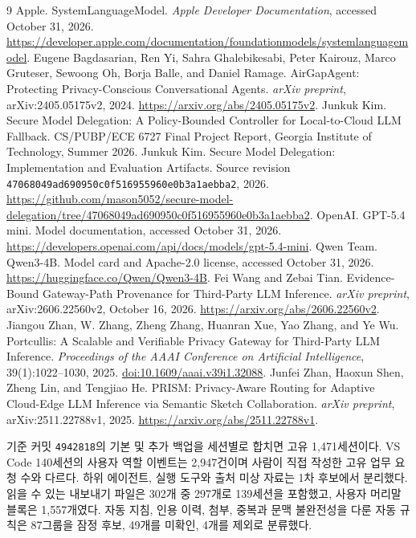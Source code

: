 \documentclass[10pt,letterpaper,twocolumn]{article}
\makeatletter
\renewcommand{\section}{\@startsection{section}{1}{\z@}{-2ex plus -.5ex minus -.2ex}{1ex plus .2ex}{\large\bfseries\raggedright}}
\makeatother
\begin{document}
\begin{thebibliography}{9}
Apple.
SystemLanguageModel. \emph{Apple Developer Documentation}, accessed October 31, 2026.
\url{https://developer.apple.com/documentation/foundationmodels/systemlanguagemodel}.
Eugene Bagdasarian, Ren Yi, Sahra Ghalebikesabi, Peter Kairouz, Marco Gruteser, Sewoong Oh, Borja Balle, and Daniel Ramage.
AirGapAgent: Protecting Privacy-Conscious Conversational Agents.
\emph{arXiv preprint}, arXiv:2405.05175v2, 2024.
\url{https://arxiv.org/abs/2405.05175v2}.
Junkuk Kim.
Secure Model Delegation: A Policy-Bounded Controller for Local-to-Cloud LLM Fallback.
CS/PUBP/ECE 6727 Final Project Report, Georgia Institute of Technology, Summer 2026.
Junkuk Kim.
Secure Model Delegation: Implementation and Evaluation Artifacts.
Source revision \texttt{47068049ad690950c0f516955960e0b3a1aebba2}, 2026.
\url{https://github.com/mason5052/secure-model-delegation/tree/47068049ad690950c0f516955960e0b3a1aebba2}.
OpenAI.
GPT-5.4 mini. Model documentation, accessed October 31, 2026.
\url{https://developers.openai.com/api/docs/models/gpt-5.4-mini}.
Qwen Team.
Qwen3-4B. Model card and Apache-2.0 license, accessed October 31, 2026.
\url{https://huggingface.co/Qwen/Qwen3-4B}.
Fei Wang and Zebai Tian.
Evidence-Bound Gateway-Path Provenance for Third-Party LLM Inference.
\emph{arXiv preprint}, arXiv:2606.22560v2, October 16, 2026.
\url{https://arxiv.org/abs/2606.22560v2}.
Jiangou Zhan, W. Zhang, Zheng Zhang, Huanran Xue, Yao Zhang, and Ye Wu.
Portcullis: A Scalable and Verifiable Privacy Gateway for Third-Party LLM Inference.
\emph{Proceedings of the AAAI Conference on Artificial Intelligence}, 39(1):1022--1030, 2025.
\href{https://doi.org/10.1609/aaai.v39i1.32088}{doi:10.1609/aaai.v39i1.32088}.
Junfei Zhan, Haoxun Shen, Zheng Lin, and Tengjiao He.
PRISM: Privacy-Aware Routing for Adaptive Cloud-Edge LLM Inference via Semantic Sketch Collaboration.
\emph{arXiv preprint}, arXiv:2511.22788v1, 2025.
\url{https://arxiv.org/abs/2511.22788v1}.
\end{thebibliography}

\appendix
\section{업무 자료 선별과 합성화의 범위}
\label{app:d64}
기준 커밋 \texttt{4942818}의 기본 및 추가 백업을 세션별로 합치면 고유 1,471세션이다. VS Code 140세션의 사용자 역할 이벤트는 2,947건이며 사람이 직접 작성한 고유 업무 요청 수와 다르다. 하위 에이전트, 실행 도구와 출처 미상 자료는 1차 후보에서 분리했다. 읽을 수 있는 내보내기 파일은 302개 중 297개로 139세션을 포함했고, 사용자 머리말 블록은 1,557개였다. 자동 지침, 인용 이력, 첨부, 중복과 문맥 불완전성을 다룬 자동 규칙은 87그룹을 잠정 후보, 49개를 미확인, 4개를 제외로 분류했다.
\end{document}
